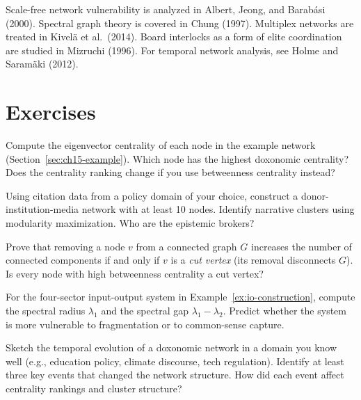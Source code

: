 Scale-free network vulnerability is analyzed in Albert, Jeong, and Barab\'{a}si (2000).
Spectral graph theory is covered in Chung (1997).
Multiplex networks are treated in Kivel\"{a} et al.\ (2014).
Board interlocks as a form of elite coordination are studied in Mizruchi (1996).
For temporal network analysis, see Holme and Saram\"{a}ki (2012).


\section{Exercises}

\begin{exercise}
Compute the eigenvector centrality of each node in the example network (Section~\ref{sec:ch15-example}).
Which node has the highest doxonomic centrality?
Does the centrality ranking change if you use betweenness centrality instead?
\end{exercise}

\begin{exercise}
Using citation data from a policy domain of your choice, construct a donor-institution-media network with at least 10 nodes.
Identify narrative clusters using modularity maximization.
Who are the epistemic brokers?
\end{exercise}

\begin{exercise}
Prove that removing a node $v$ from a connected graph $G$ increases the number of connected components if and only if $v$ is a \emph{cut vertex} (its removal disconnects $G$).
Is every node with high betweenness centrality a cut vertex?
\end{exercise}

\begin{exercise}
\label{ex:ch15-spectral}
For the four-sector input-output system in Example~\ref{ex:io-construction}, compute the spectral radius $\lambda_1$ and the spectral gap $\lambda_1 - \lambda_2$.
Predict whether the system is more vulnerable to fragmentation or to common-sense capture.
\end{exercise}

\begin{exercise}
\label{ex:ch15-temporal}
Sketch the temporal evolution of a doxonomic network in a domain you know well (e.g., education policy, climate discourse, tech regulation).
Identify at least three key events that changed the network structure.
How did each event affect centrality rankings and cluster structure?
\end{exercise}


